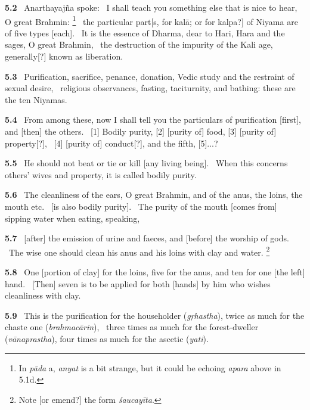 \documentclass{article}
\newcommand{\skt}[1]{\textit{#1}}
\begin{document}
\textbf{5.2}%
\ Anarthayajña spoke:%
\ I shall teach you something else that is nice to hear, O great Brahmin:%
\footnote{In \skt{pāda} a, \skt{anyat} is a bit strange, but it could be echoing \skt{apara} above in 5.1d. }%
\ the particular part[s, for kalā; or for kalpa?] of Niyama are of five types [each].%
\ It is the essence of Dharma, dear to Hari, Hara and the sages, O great Brahmin,%
\ the destruction of the impurity of the Kali age, generally[?] known as liberation.%


\textbf{5.3}%
\ Purification, sacrifice, penance, donation, Vedic study and the restraint of sexual desire,%
\ religious observances, fasting, taciturnity, and bathing: these are the ten Niyamas.%


\textbf{5.4}%
\ From among these, now I shall tell you the particulars of purification [first], and [then] the others.%
\ [1] Bodily purity, [2] [purity of] food, [3] [purity of] property[?],%
\                  [4] [purity of] conduct[?], and the fifth, [5]...?%


\textbf{5.5}%
\ He should not beat or tie or kill [any living being].%
\ When this concerns others' wives and property, it is called bodily purity.%


\textbf{5.6}%
\ The cleanliness of the ears, O great Brahmin, and of the anus, the loins, the mouth etc.%
\                 [is also bodily purity].%
\ The purity of the mouth [comes from] sipping water when eating, speaking,%


\textbf{5.7}%
\ [after] the emission of urine and faeces, and [before] the worship of gods.%
\ The wise one should clean his anus and his loins with clay and water.%
\footnote{Note [or emend?] the form \skt{śaucayīta}.  }%


\textbf{5.8}%
\ One [portion of clay] for the loins, five for the anus, and ten for one [the left] hand.%
\ [Then] seven is to be applied for both [hands] by him who wishes cleanliness with clay.%


\textbf{5.9}%
\ This is the purification for the householder (\skt{gṛhastha}), twice as much for the chaste one (\skt{brahmacārin}),%
\                  three times as much for the forest-dweller (\skt{vānaprastha}), four times as much for the ascetic (\skt{yati}).%
\end{document}
